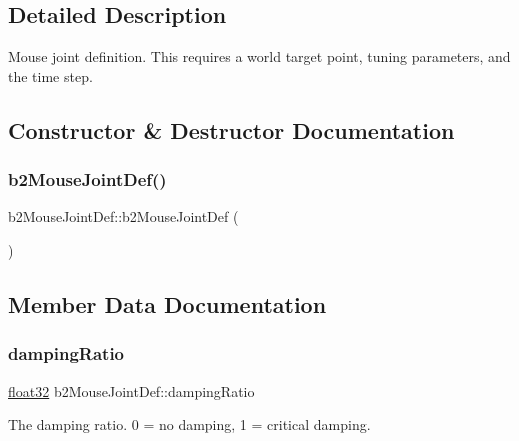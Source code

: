 \subsection{Detailed Description}
Mouse joint definition. This requires a world target point, tuning parameters, and the time step. 

\subsection{Constructor \& Destructor Documentation}
\mbox{\label{structb2_mouse_joint_def_ac367e7d89eadeeac53473f248f4dcdf7}} 
\subsubsection{\texorpdfstring{b2MouseJointDef()}{b2MouseJointDef()}}
{\footnotesize\ttfamily b2\+Mouse\+Joint\+Def\+::b2\+Mouse\+Joint\+Def (\begin{DoxyParamCaption}{ }\end{DoxyParamCaption})\hspace{0.3cm}{\ttfamily [inline]}}



\subsection{Member Data Documentation}
\mbox{\label{structb2_mouse_joint_def_aee42888dab204a5c5745ba61acbfb7d6}} 
\subsubsection{\texorpdfstring{dampingRatio}{dampingRatio}}
{\footnotesize\ttfamily \mbox{\hyperlink{b2_settings_8h_aacdc525d6f7bddb3ae95d5c311bd06a1}{float32}} b2\+Mouse\+Joint\+Def\+::damping\+Ratio}



The damping ratio. 0 = no damping, 1 = critical damping. 

\mbox{\label{structb2_mouse_joint_def_a61e9017eb928608f75edddb6e0ca7f63}} 
